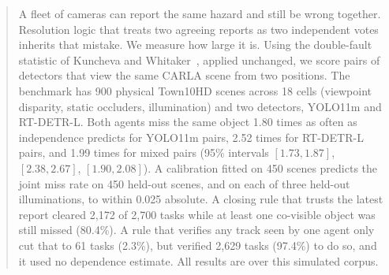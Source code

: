\begin{abstract}
A fleet of cameras can report the same hazard and still be wrong together.
Resolution logic that treats two agreeing reports as two independent votes
inherits that mistake. We measure how large it is. Using the double-fault
statistic of Kuncheva and Whitaker~\cite{kuncheva2003}, applied unchanged, we
score pairs of detectors that view the same CARLA scene from two positions.
The benchmark has 900 physical Town10HD scenes across 18 cells (viewpoint
disparity, static occluders, illumination) and two detectors, YOLO11m and
RT-DETR-L. Both agents miss the same object 1.80 times as often as
independence predicts for YOLO11m pairs, 2.52 times for RT-DETR-L pairs, and
1.99 times for mixed pairs (95\% intervals $[1.73,1.87]$, $[2.38,2.67]$,
$[1.90,2.08]$). A calibration fitted on 450 scenes predicts the joint miss
rate on 450 held-out scenes, and on each of three held-out illuminations, to
within 0.025 absolute. A closing rule that trusts the latest report cleared
2{,}172 of 2{,}700 tasks while at least one co-visible object was still missed
(80.4\%). A rule that verifies any track seen by one agent only cut that to 61
tasks (2.3\%), but verified 2{,}629 tasks (97.4\%) to do so, and it used no
dependence estimate. All results are over this simulated corpus.
\end{abstract}
